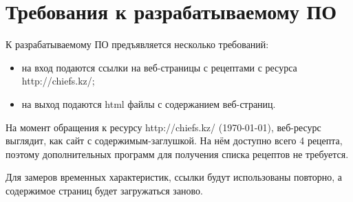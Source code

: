 \chapter{Требования к разрабатываемому ПО}

К разрабатываемому ПО предъявляется несколько требований:
\begin{itemize}
    \item на вход подаются ссылки на веб-страницы с рецептами с ресурса http://chiefs.kz/;
    \item на выход подаются html файлы с содержанием веб-страниц.
\end{itemize}

На момент обращения к ресурсу http://chiefs.kz/ (\today), веб-ресурс выглядит, как сайт с содержимым-заглушкой. На нём доступно всего 4 рецепта, поэтому дополнительных программ для получения списка рецептов не требуется.

Для замеров временных характеристик, ссылки будут использованы повторно, а содержимое страниц будет загружаться заново.